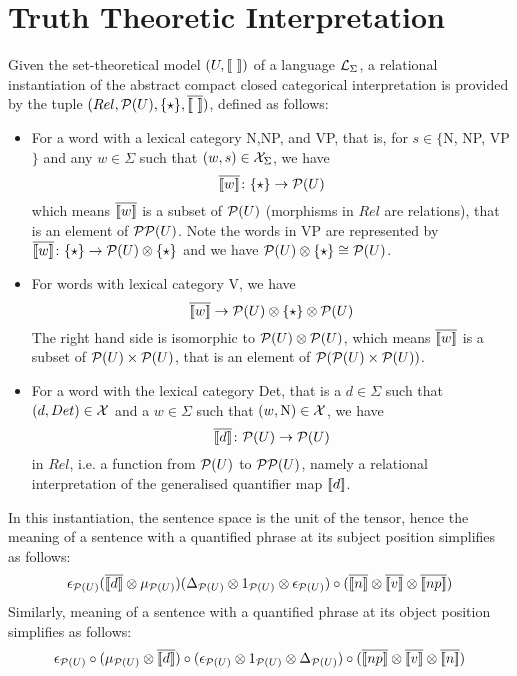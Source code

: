 \section{Truth Theoretic Interpretation}

Given the set-theoretical model $(U, [\![ \  ]\!])$ of a language ${\cal L}_{\Sigma}$, a  relational instantiation of the abstract compact closed categorical interpretation is  provided by the tuple $(Rel, {\cal P}(U), \{\star\}, \overline{[\![ \  ]\!]})$, defined as follows: 
\begin{itemize}
\item For a word with a lexical category N,NP, and VP, that is,  for $s \in \{$N, NP, VP$\}$ and any  $w \in \Sigma$ such that  $(w,s) \in {\cal X}_{\Sigma}$,  we have  
\[
\overline{[\![ w ]\!]} \colon \{\star\} \to {\cal P}(U)
\]
which means $\overline{[\![ w ]\!]}$  is a subset of ${\cal P}(U)$ (morphisms in $Rel$ are relations), that is an element  of $ {\cal P}{\cal P}(U)$.  Note the words in VP are represented by $\overline{[\![ w ]\!]} \colon \{\star\} \to {\cal P}(U) \otimes \{\star\}$ and we have ${\cal P}(U) \otimes \{\star\} \cong {\cal P}(U)$. 
\item For words with lexical category V, we have
\[
\overline{[\![ w ]\!]} \to   {\cal P}(U) \otimes \{\star\}  \otimes {\cal P}(U) 
\]
The right hand side is isomorphic  to ${\cal P}(U) \otimes {\cal P}(U)$, which means $\overline{[\![ w ]\!]} $ is a subset of ${\cal P}(U) \times {\cal P}(U)$, that is an element of ${\cal P}({\cal P}(U) \times {\cal P}(U))$. 

\item For a word with the lexical category Det, that is a $d \in \Sigma$ such that $(d, Det) \in {\cal X}$ and a $w \in \Sigma$ such that $(w, \text{N}) \in {\cal X}$, we have 
\[
\overline{[\![ d ]\!]}  \colon {\cal P}(U) \to {\cal P}(U)
\]
in $Rel$, i.e. a function from ${\cal P}(U)$ to ${\cal P}{\cal P}(U)$, namely a relational interpretation of  the generalised quantifier map $[\![ d ]\!]$.  
\end{itemize}

In this instantiation,   the sentence space is the unit of the tensor,   hence the meaning of a sentence with a quantified phrase at its subject position simplifies as follows:
\[
\epsilon_{{\cal P}(U)}(\overline{\semantics{d}} \otimes  \mu_{{\cal P}(U)})(\Delta_{{\cal P}(U)} \otimes 1_{{{\cal P}(U)}} \otimes \epsilon_{{\cal P}(U)}) \circ
(\overline{\semantics{n}} \otimes \overline{\semantics{{v}}} \otimes \overline{\semantics{np}})
\]
Similarly, meaning of a sentence with a quantified phrase at its object position simplifies as follows:
\[
\epsilon_{{\cal P}(U)} \circ (\mu_{{\cal P}(U)} \otimes \overline{\semantics{d}}) \circ (\epsilon_{{\cal P}(U)} \otimes 1_{{{\cal P}(U)}} \otimes \Delta_{{\cal P}(U)}) \circ (\overline{\semantics{np}} \otimes \overline{\semantics{v}} \otimes \overline{\semantics{n}})
\]



